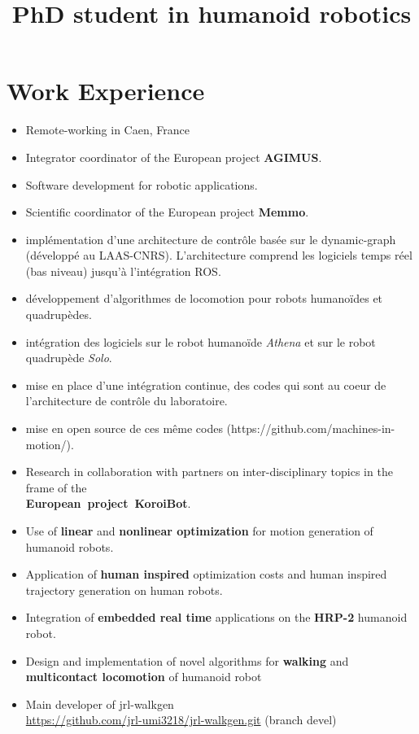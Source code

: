 \documentclass[11pt,a4paper]{moderncv}
\title{PhD student in humanoid robotics}
\newcommand{\items}{\item[*] \hspace{2mm}}
\begin{document}

\maketitle

\vspace*{1cm}

\section{Work Experience}
{
  \begin{itemize}%
    \items Remote-working in Caen, France
    \items Integrator coordinator of the European project \textbf{AGIMUS}.
    \items Software development for robotic applications.
  \end{itemize}
}
{
  \begin{itemize}%
    \items Scientific coordinator of the European project \textbf{Memmo}.
  \end{itemize}
}
{
  \begin{itemize}%
    \items impl\'ementation d'une architecture de contr\^ole bas\'ee sur le
    dynamic-graph (d\'evelopp\'e au LAAS-CNRS). L'architecture comprend
    les logiciels temps r\'eel (bas niveau) jusqu'\`a l'int\'egration ROS.
    \items d\'eveloppement d'algorithmes de locomotion pour robots humano\"ides
    et quadrup\`edes.
    \items int\'egration des logiciels sur le robot humano\"ide \emph{Athena} et
    sur le robot quadrup\`ede \emph{Solo}.
    \items mise en place d'une int\'egration continue, des codes qui sont au
    coeur de l'architecture de contr\^ole du laboratoire.
    \items mise en open source de ces m\^eme codes
    (https://github.com/machines-in-motion/).
  \end{itemize}
}
{
\begin{itemize}%
\items Research in collaboration with partners on inter-disciplinary topics in the frame of the\\ \textbf{European~project~KoroiBot}.
\items Use of \textbf{linear} and \textbf{nonlinear optimization} for motion generation of humanoid robots.
\items Application of \textbf{human inspired} optimization costs and human inspired trajectory generation on human robots.
\items Integration of \textbf{embedded real time} applications on the \textbf{HRP-2} humanoid robot.
\items Design and implementation of novel algorithms for \textbf{walking} and \textbf{multicontact locomotion} of humanoid robot
\items Main developer of jrl-walkgen\\ \url{https://github.com/jrl-umi3218/jrl-walkgen.git} (branch devel)
\newline{}
\end{itemize}
}
\end{document}
